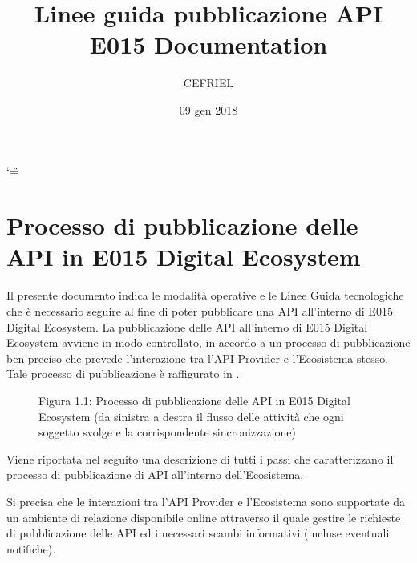 \documentclass[letterpaper,10pt,italian]{sphinxmanual}
\title{Linee guida pubblicazione API E015 Documentation}
\date{09 gen 2018}
\author{CEFRIEL}
\begin{document}
\ifnum\catcode`\"=\active{}\fi
\maketitle
\sphinxtableofcontents
{}\label{\detokenize{index::doc}}


\begin{figure}[htbp]
\centering

\noindent{}
\end{figure}


\chapter{Processo di pubblicazione delle API in E015 Digital Ecosystem}
\label{\detokenize{process:linee-guida-per-la-pubblicazione-di-api-in-e015-digital-ecosystem}}\label{\detokenize{process::doc}}\label{\detokenize{process:processo-di-pubblicazione-delle-api-in-e015-digital-ecosystem}}


Il presente documento indica le modalità operative e le Linee Guida tecnologiche che è necessario seguire al fine di poter pubblicare una API all’interno di E015 Digital Ecosystem.
La pubblicazione delle API all’interno di E015 Digital Ecosystem avviene in modo controllato, in accordo a un processo di pubblicazione ben preciso che prevede l’interazione tra l’API Provider e l’Ecosistema stesso.
Tale processo di pubblicazione è raffigurato in  {\hyperref[\detokenize{process:processoapi}]{}}.

\begin{figure}[htbp]
\centering
\capstart

\noindent{}
\caption{Figura 1.1: Processo di pubblicazione delle API in E015 Digital Ecosystem (da sinistra a destra il flusso delle attività che ogni soggetto svolge e la corrispondente sincronizzazione)}\label{\detokenize{process:processoapi}}\label{\detokenize{process:id1}}\end{figure}

Viene riportata nel seguito una descrizione di tutti i passi che caratterizzano il processo di pubblicazione di API all’interno dell’Ecosistema.

Si precisa che le interazioni tra l’API Provider e l’Ecosistema sono supportate da un ambiente di relazione disponibile online attraverso il quale gestire le richieste di pubblicazione delle API ed i necessari scambi informativi (incluse eventuali notifiche).
\end{document}
